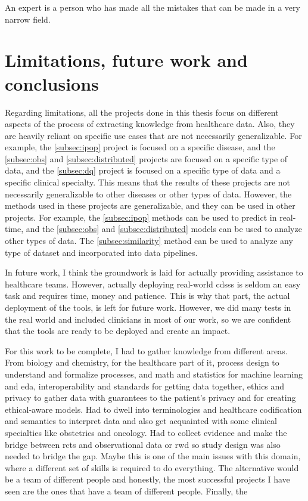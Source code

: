 \begin{savequote}[75mm]
An expert is a person who has made all the mistakes that can be made in a very narrow field.
\end{savequote}
\chapter{Limitations, future work and conclusions} \label{chap:conclusion}

Regarding limitations, all the projects done in this thesis focus on different aspects of the process of extracting knowledge from healthcare data. Also, they are heavily reliant on specific use cases that are not necessarily generalizable. For example, the \ref{subsec:ipop} project is focused on a specific disease, and the \ref{subsec:obs} and \ref{subsec:distributed} projects are focused on a specific type of data, and the \ref{subsec:dq} project is focused on a specific type of data and a specific clinical specialty. This means that the results of these projects are not necessarily generalizable to other diseases or other types of data. However, the methods used in these projects are generalizable, and they can be used in other projects. For example, the \ref{subsec:ipop} methods can be used to predict in real-time, and the \ref{subsec:obs} and \ref{subsec:distributed} models can be used to analyze other types of data. The \ref{subsec:similarity} method can be used to analyze any type of dataset and incorporated into data pipelines.

In future work, I think the groundwork is laid for actually providing assistance to healthcare teams. However, actually deploying real-world \acp{cdss} is seldom an easy task and requires time, money and patience. This is why that part, the actual deployment of the tools, is left for future work. However, we did many tests in the real world and included clinicians in most of our work, so we are confident that the tools are ready to be deployed and create an impact.



For this work to be complete, I had to gather knowledge from different areas. From biology and chemistry, for the healthcare part of it, process design to understand and formalize processes, and math and statistics for machine learning and \ac{eda}, interoperability and standards for getting data together, ethics and privacy to gather data with guarantees to the patient's privacy and for creating ethical-aware models. Had to dwell into terminologies and healthcare codification and semantics to interpret data and also get acquainted with some clinical specialties like obstetrics and oncology. Had to collect evidence and make the bridge between \acp{rct} and observational data or \ac{rwd} so study design was also needed to bridge the gap.
Maybe this is one of the main issues with this domain, where a different set of skills is required to do everything. The alternative would be a team of different people and honestly, the most successful projects I have seen are the ones that have a team of different people.
Finally, the 

